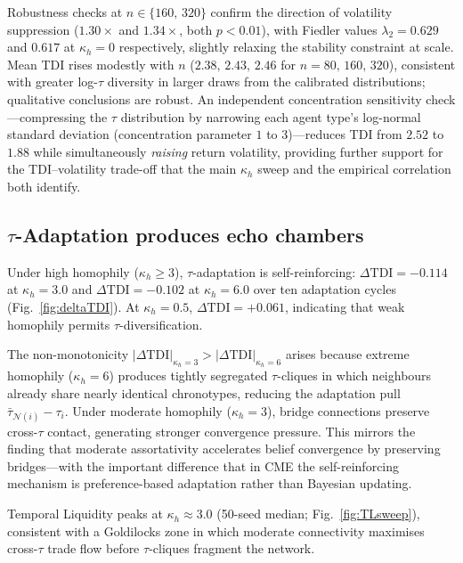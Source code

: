 \documentclass[preprint,12pt,authoryear]{elsarticle}
\begin{document}
Robustness checks at $n \in \{160,\,320\}$ confirm the direction of
volatility suppression ($1.30\times$ and $1.34\times$, both $p < 0.01$),
with Fiedler values $\lambda_2 = 0.629$ and $0.617$ at $\kappa_h = 0$
respectively, slightly relaxing the stability constraint at scale.
Mean TDI rises modestly with $n$ ($2.38,\,2.43,\,2.46$ for
$n = 80,\,160,\,320$), consistent with greater log-$\tau$ diversity in
larger draws from the calibrated distributions; qualitative conclusions
are robust.
An independent concentration sensitivity check---compressing the $\tau$
distribution by narrowing each agent type's log-normal standard deviation
(concentration parameter $1$ to $3$)---reduces TDI from $2.52$ to $1.88$
while simultaneously \emph{raising} return volatility, providing further
support for the TDI--volatility trade-off that the main $\kappa_h$ sweep
and the empirical correlation both identify.

\subsection{$\tau$-Adaptation produces echo chambers}

Under high homophily ($\kappa_h \geq 3$), $\tau$-adaptation is
self-reinforcing: $\Delta\mathrm{TDI} = -0.114$ at $\kappa_h = 3.0$ and
$\Delta\mathrm{TDI} = -0.102$ at $\kappa_h = 6.0$ over ten adaptation
cycles (Fig.~\ref{fig:deltaTDI}).
At $\kappa_h = 0.5$, $\Delta\mathrm{TDI} = +0.061$, indicating that weak
homophily permits $\tau$-diversification.

The non-monotonicity $|\Delta\mathrm{TDI}|_{\kappa_h=3} >
|\Delta\mathrm{TDI}|_{\kappa_h=6}$ arises because extreme homophily
($\kappa_h = 6$) produces tightly segregated $\tau$-cliques in which
neighbours already share nearly identical chronotypes, reducing the
adaptation pull $\bar{\tau}_{\mathcal{N}(i)} - \tau_i$.
Under moderate homophily ($\kappa_h = 3$), bridge connections preserve
cross-$\tau$ contact, generating stronger convergence pressure.
This mirrors the \citet{golub2012} finding that moderate assortativity
accelerates belief convergence by preserving bridges---with the important
difference that in CME the self-reinforcing mechanism is
preference-based adaptation rather than Bayesian updating.

Temporal Liquidity peaks at $\kappa_h \approx 3.0$ (50-seed median;
Fig.~\ref{fig:TLsweep}), consistent with a Goldilocks zone in which moderate
connectivity maximises cross-$\tau$ trade flow before $\tau$-cliques
fragment the network.
\end{document}
